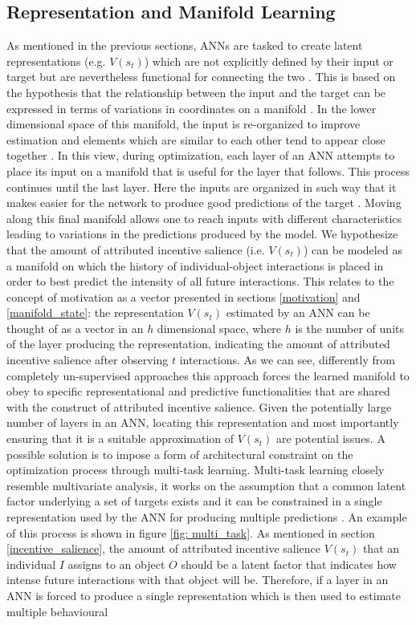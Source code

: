 \subsection{Representation and Manifold Learning}
\label{manifold_learning}
As mentioned in the previous sections, ANNs are tasked to create latent representations (e.g. $V(s_{t})$) which are not explicitly defined by their input or target but are nevertheless functional for connecting the two \cite{rumelhart1986learning,bengio2017deep,lillicrap2020backpropagation}. This is based on the hypothesis that the relationship between the input and the target can be expressed in terms of variations in coordinates on a manifold \cite{bengio2017deep}. In the lower dimensional space of this manifold, the input is re-organized to improve estimation and elements which are similar to each other tend to appear close together \cite{bengio2017deep}. In this view, during optimization, each layer of an ANN attempts to place its input on a manifold that is useful for the layer that follows. This process continues until the last layer. Here the inputs are organized in such way that it makes easier for the network to produce good predictions of the target \cite{bengio2017deep}. Moving along this final manifold allows one to reach inputs with different characteristics leading to variations in the predictions produced by the model. We hypothesize that the amount of attributed incentive salience (i.e. $V(s_{t})$) can be modeled as a manifold on which the history of individual-object interactions is placed in order to best predict the intensity of all future interactions. This relates to the concept of motivation as a vector presented in sections \ref{motivation} and \ref{manifold_state}: the representation $V(s_{t})$ estimated by an ANN can be thought of as a vector in an $h$ dimensional space, where $h$ is the number of units of the layer producing the representation, indicating the amount of attributed incentive salience after observing $t$ interactions. As we can see, differently from completely un-supervised approaches this approach forces the learned manifold to obey to specific representational and predictive functionalities that are shared with the construct of attributed incentive salience. Given the potentially large number of layers in an ANN, locating this representation and most importantly ensuring that it is a suitable approximation of $V(s_{t})$ are potential issues. A possible solution is to impose a form of architectural constraint on the optimization process through multi-task learning. Multi-task learning closely resemble multivariate analysis, it  works on the assumption that a common latent factor underlying a set of targets exists and it can be constrained in a single representation used by the ANN for producing multiple predictions \cite{bengio2017deep}. An example of this process is shown in figure \ref{fig: multi_task}. As mentioned in section \ref{incentive_salience}, the amount of attributed incentive salience $V(s_t)$ that an individual $I$ assigns to an object $O$ should be a latent factor that indicates how intense future interactions with that object will be. Therefore, if a layer in an ANN is forced to produce a single representation which is then used to estimate multiple behavioural 